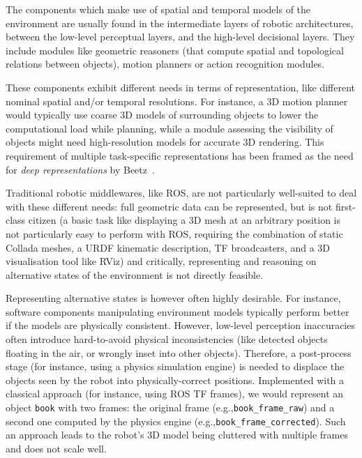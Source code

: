 \documentclass[conference]{IEEEtran}
\newcommand{\eg}{e.g.,\xspace}
\begin{document}
The components which make use of spatial and temporal models of the environment
are usually found in the intermediate layers of robotic architectures, between
the low-level perceptual layers, and the high-level decisional layers. They
include modules like geometric reasoners (that compute spatial and topological
relations between objects), motion planners or action recognition modules.

These components exhibit different needs in terms of representation,
like different nominal spatial and/or temporal resolutions. For instance, a 3D
motion planner would typically use coarse 3D models of surrounding objects to
lower the computational load while planning, while a module assessing the
visibility of objects might need high-resolution models 
for accurate 3D rendering. This requirement of multiple
task-specific representations has been framed as the need for \emph{deep
representations} by Beetz~\cite{beetz2010towards}.


Traditional robotic middlewares, like ROS, are not particularly well-suited to
deal with these different needs: full geometric data can be represented, but is
not first-class citizen (a basic task like displaying a 3D mesh at an arbitrary
position is not particularly easy to perform with ROS, requiring the combination
of static Collada meshes, a URDF kinematic description, TF broadcasters, and a
3D visualisation tool like RViz) and critically,
representing and reasoning on alternative states of the environment is not
directly feasible.

Representing alternative states is however often highly desirable. For instance,
software components manipulating environment models typically perform better if
the models are physically consistent. However, low-level perception inaccuracies
often introduce hard-to-avoid physical inconsistencies (like detected objects
floating in the air, or wrongly inset into other objects).
Therefore, a post-process stage (for instance, using a physics simulation
engine) is needed to displace the objects seen by the robot into
physically-correct positions. Implemented with a classical approach (for
instance, using ROS TF frames), we would represent an object {\tt book} with two
frames: the original frame (\eg {\tt book\_frame\_raw}) and a second one
computed by the physics engine (\eg {\tt book\_frame\_corrected}). Such an
approach leads to the robot's 3D model being cluttered with multiple frames and
does not scale well.
\end{document}
